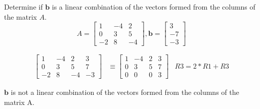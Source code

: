 \documentclass{mathhomework}
\newcommand{\Vect}[1]{\pmb{#1}}
\begin{document}
\begin{problem}[1.3\#13]
    Determine if $\Vect{b}$ is a linear combination of the vectors formed from the columns of the matrix $A$.
    \begin{equation*}
        A = \begin{bmatrix}
            1 & -4 & 2 \\
            0 & 3 & 5 \\
            -2 & 8 & -4
        \end{bmatrix},
        \Vect{b} = \begin{bmatrix}
            3 \\ -7 \\ -3
        \end{bmatrix}
    \end{equation*}

    \begin{solution}
        \begin{align*}
            \begin{bmatrix}
                1 & -4 & 2 & 3 \\
                0 & 3 & 5 & 7 \\
                -2 & 8 & -4 & -3
            \end{bmatrix}
            & \equiv
            \begin{bmatrix}
                1 & -4 & 2 & 3 \\
                0 & 3 & 5 & 7 \\
                0 & 0 & 0 & 3
            \end{bmatrix}
            & R3 = 2 * R1 + R3
        \end{align*}

        $\Vect{b}$ is not a linear combination of the vectors formed from the columns of the matrix A.
    \end{solution}
\end{problem}
\end{document}
